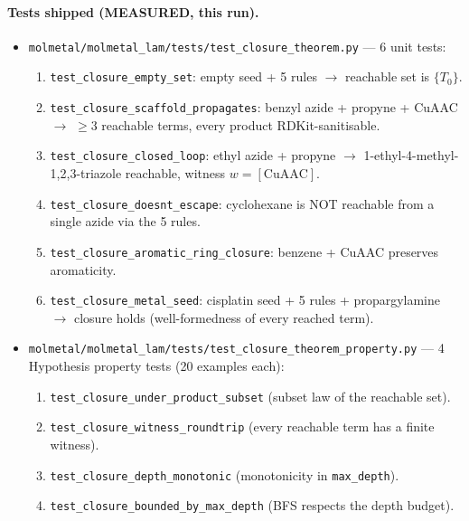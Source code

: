 \paragraph{Tests shipped (MEASURED, this run).}
\begin{itemize}
  \item \texttt{molmetal/molmetal\_lam/tests/test\_closure\_theorem.py}
        --- 6 unit tests:
        \begin{enumerate}
          \item \texttt{test\_closure\_empty\_set}: empty seed +
                5 rules $\rightarrow$ reachable set is $\{T_0\}$.
          \item \texttt{test\_closure\_scaffold\_propagates}: benzyl
                azide + propyne + CuAAC $\rightarrow$ $\ge 3$
                reachable terms, every product RDKit-sanitisable.
          \item \texttt{test\_closure\_closed\_loop}: ethyl azide +
                propyne $\rightarrow$ 1-ethyl-4-methyl-1,2,3-triazole
                reachable, witness $w = [\mathrm{CuAAC}]$.
          \item \texttt{test\_closure\_doesnt\_escape}: cyclohexane is
                NOT reachable from a single azide via the 5 rules.
          \item \texttt{test\_closure\_aromatic\_ring\_closure}:
                benzene + CuAAC preserves aromaticity.
          \item \texttt{test\_closure\_metal\_seed}: cisplatin seed
                + 5 rules + propargylamine $\rightarrow$ closure
                holds (well-formedness of every reached term).
        \end{enumerate}
  \item \texttt{molmetal/molmetal\_lam/tests/test\_closure\_theorem\_property.py}
        --- 4 Hypothesis property tests (20 examples each):
        \begin{enumerate}
          \item \texttt{test\_closure\_under\_product\_subset}
                (subset law of the reachable set).
          \item \texttt{test\_closure\_witness\_roundtrip}
                (every reachable term has a finite witness).
          \item \texttt{test\_closure\_depth\_monotonic}
                (monotonicity in \texttt{max\_depth}).
          \item \texttt{test\_closure\_bounded\_by\_max\_depth}
                (BFS respects the depth budget).
        \end{enumerate}
\end{itemize}

